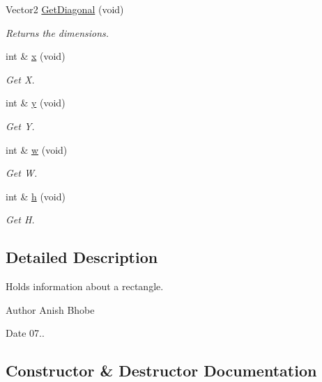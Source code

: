 \begin{DoxyCompactItemize}
Vector2 \mbox{\hyperlink{classinferno_1_1graphics_1_1_quad_ad7b1b10ee7f32e9486b41ae89cf0d71b}{Get\+Diagonal}} (void)
\begin{DoxyCompactList}\small\item\em Returns the dimensions. \end{DoxyCompactList}\item 
int \& \mbox{\hyperlink{classinferno_1_1graphics_1_1_quad_aed2540662e5f85e5ab467517dccaf90f}{x}} (void)
\begin{DoxyCompactList}\small\item\em Get X. \end{DoxyCompactList}\item 
int \& \mbox{\hyperlink{classinferno_1_1graphics_1_1_quad_af653ab1040d4647e88487287765f7404}{y}} (void)
\begin{DoxyCompactList}\small\item\em Get Y. \end{DoxyCompactList}\item 
int \& \mbox{\hyperlink{classinferno_1_1graphics_1_1_quad_a7670f2faa1d1b88bb8202d4efa968899}{w}} (void)
\begin{DoxyCompactList}\small\item\em Get W. \end{DoxyCompactList}\item 
int \& \mbox{\hyperlink{classinferno_1_1graphics_1_1_quad_af5653f4d125b24ac94ab8367e310e541}{h}} (void)
\begin{DoxyCompactList}\small\item\em Get H. \end{DoxyCompactList}\end{DoxyCompactItemize}


\subsection{Detailed Description}
Holds information about a rectangle. 

\begin{DoxyAuthor}{Author}
Anish Bhobe 
\end{DoxyAuthor}
\begin{DoxyDate}{Date}
07.. 
\end{DoxyDate}


\subsection{Constructor \& Destructor Documentation}
\mbox{\label{classinferno_1_1graphics_1_1_quad_a2f73b62580d65d3eea736df1ffccbd1c}} 
